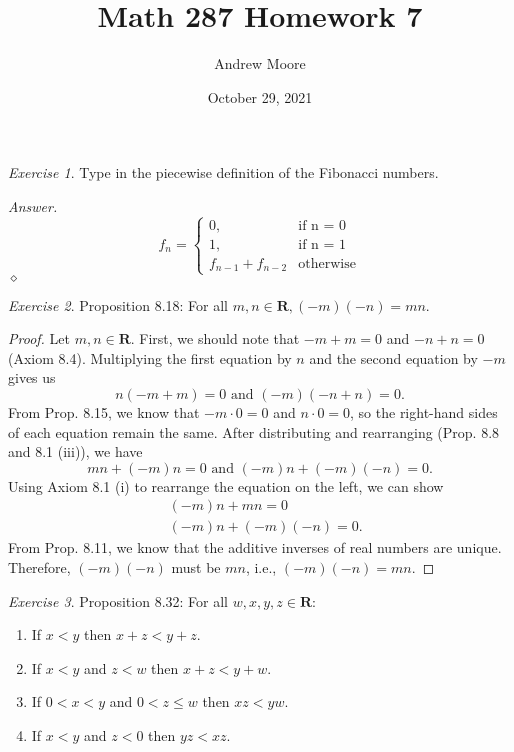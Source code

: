 \documentclass[12pt,oneside]{amsart}
\title{Math 287 Homework 7}
\author{Andrew Moore}
\date{October 29, 2021} %
\theoremstyle{remark}
\newtheorem{exer}{Exercise}
\newcommand{\bfR}{\mathbf{R}}
\newenvironment{answer}{\bigskip\noindent\emph{Answer.}}{\hfill$\diamond$\newline}
\begin{document}
\maketitle

%
%
%
%
\begin{exer}
Type in the piecewise definition of the Fibonacci numbers.
\end{exer}

\begin{answer}
$$
f_n =
  \begin{cases}
    0,                    & \text{if n = 0} \\
    1,                    & \text{if n = 1} \\
    f_{n - 1} + f_{n - 2} & \text{otherwise}
  \end{cases}
$$
\end{answer}

%
%
%
%
\newpage
\begin{exer}
Proposition 8.18: For all $m,n \in \bfR, (-m)(-n) = mn$.
\end{exer}

\begin{proof}
Let $m,n \in \bfR$. First, we should note that $-m + m = 0$ and $-n + n = 0$ (Axiom 8.4). Multiplying the first equation by $n$ and the second equation by $-m$ gives us \[ n(-m + m) = 0 \text{ and } (-m)(-n + n) = 0. \] From Prop. 8.15, we know that $-m \cdot 0 = 0$ and $n \cdot 0 = 0$, so the right-hand sides of each equation remain the same. After distributing and rearranging (Prop. 8.8 and 8.1 (iii)), we have \[ mn + (-m)n = 0 \text{ and } (-m)n + (-m)(-n) = 0. \] Using Axiom 8.1 (i) to rearrange the equation on the left, we can show
\begin{align*}
&(-m)n + mn = 0 \\
&(-m)n + (-m)(-n) = 0.
\end{align*}
From Prop. 8.11, we know that the additive inverses of real numbers are unique. Therefore, $(-m)(-n)$ must be $mn$, i.e., $(-m)(-n) = mn$.
\end{proof}

%
%
%
%
\newpage
\begin{exer}
Proposition 8.32: For all $w,x,y,z \in \bfR$:
\begin{enumerate}
  \item If $x < y$ then $x + z < y + z$.
  \item If $x < y$ and $z < w$ then $x + z < y + w$.
  \item If $0 < x < y$ and $0 < z \leq w$ then $xz < yw$.
  \item If $x < y$ and $z < 0$ then $yz < xz$.
\end{enumerate}
\end{exer}
\end{document}
